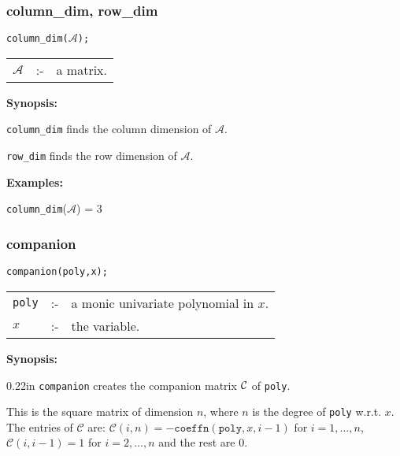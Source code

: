 \subsubsection{column\_dim, row\_dim}
\label{linalg:column_dim}

\hspace*{0.175in} {\tt column\_dim($\mathcal{A}$);}

\hspace*{0.1in} 
\begin{tabular}{l l l}
$\mathcal{A}$ &:-& a matrix.
\end{tabular}

{\bf Synopsis:} %

\hspace*{0.175in} {\tt column\_dim} finds the column dimension of 
                $\mathcal{A}$. 

\hspace*{0.175in} {\tt row\_dim} finds the row dimension of $\mathcal{A}$.

{\bf Examples:}

\hspace*{0.175in}
{\tt column\_dim}($\mathcal{A}$) = 3

\subsubsection{companion}
\label{linalg:companion}

\hspace*{0.175in} {\tt companion(poly,x);}

\hspace*{0.1in} 
\begin{tabular}{l l l}
\texttt{poly} &:-& a monic univariate polynomial in $x$. \\
$x$    &:-& the variable.
\end{tabular}

{\bf Synopsis:} %


\begin{addtolength}{\leftskip}{0.22in}
                {\tt companion} creates the companion matrix ${\cal C}$
                of \texttt{poly}. 

This is the square matrix of dimension $n$, where $n$ is the degree
of \texttt{poly} w.r.t. $x$. The entries of $\mathcal{C}$ are: $\mathcal{C}(i,n)
= -\texttt{coeffn}(\texttt{poly},x,i-1)$ for $i = 1,\ldots, n$,
$\mathcal{C}(i,i-1) = 1$ for $i=2,\ldots,n$ and the rest are 0.

\end{addtolength}


